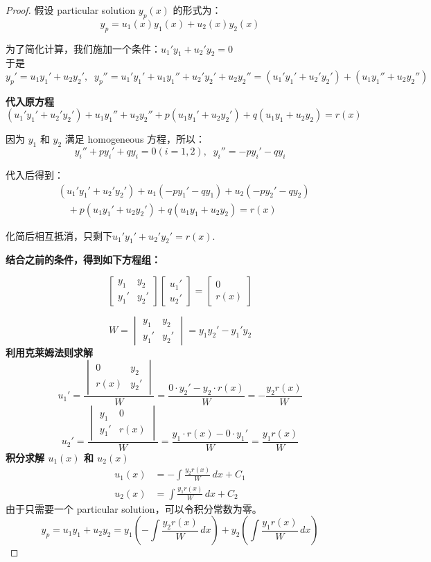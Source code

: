 \begin{proof}
假设 particular solution \( y_p(x) \) 的形式为：
\[y_p = u_1(x) y_1(x) + u_2(x) y_2(x)\]

为了简化计算，我们施加一个条件：$u_1' y_1 + u_2' y_2 = 0$
\\于是 \[y_p' = u_1 y_1' + u_2 y_2',
\;\;y_p'' = u_1' y_1' + u_1 y_1'' + u_2' y_2' + u_2 y_2'' = (u_1' y_1' + u_2' y_2') + (u_1 y_1'' + u_2 y_2'')\]

\textbf{代入原方程}
\[(u_1' y_1' + u_2' y_2') + u_1 y_1'' + u_2 y_2'' + p(u_1 y_1' + u_2 y_2') + q(u_1 y_1 + u_2 y_2) = r(x)\]

因为 \( y_1 \) 和 \( y_2 \) 满足 homogeneous 方程，所以：
\[y_i'' + p y_i' + q y_i = 0 (i = 1, 2), \;\;y_i'' = -p y_i' - q y_i\]

代入后得到：
\[\begin{aligned}
& (u_1' y_1' + u_2' y_2') + u_1 (-p y_1' - q y_1) + u_2 (-p y_2' - q y_2) \\
& \quad + p(u_1 y_1' + u_2 y_2') + q(u_1 y_1 + u_2 y_2) = r(x)
\end{aligned}\]

化简后相互抵消，只剩下$u_1' y_1' + u_2' y_2' = r(x)$.

\textbf{结合之前的条件，得到如下方程组：}

\[\begin{bmatrix}y_1 & y_2 \\y_1' & y_2'\end{bmatrix}
\begin{bmatrix}u_1' \\u_2'\end{bmatrix}=
\begin{bmatrix}0 \\r(x)\end{bmatrix}\]

\[W = \begin{vmatrix}y_1 & y_2 \\y_1' & y_2'\end{vmatrix} = y_1 y_2' - y_1' y_2\]
\textbf{利用克莱姆法则求解}
\[u_1' = \frac{\begin{vmatrix}0 & y_2 \\r(x) & y_2'\end{vmatrix}}{W} = \frac{0 \cdot y_2' - y_2 \cdot r(x)}{W} = -\frac{y_2 r(x)}{W}\]
\[u_2' = \frac{\begin{vmatrix}y_1 & 0 \\y_1' & r(x)
\end{vmatrix}}{W} = \frac{y_1 \cdot r(x) - 0 \cdot y_1'}{W} = \frac{y_1 r(x)}{W}\]
\textbf{积分求解 \( u_1(x) \) 和 \( u_2(x) \)}
\[\begin{aligned}
u_1(x) &= -\int \frac{y_2 r(x)}{W} \, dx + C_1 \\
u_2(x) &= \int \frac{y_1 r(x)}{W} \, dx + C_2
\end{aligned}\]
由于只需要一个 particular solution，可以令积分常数为零。
\[y_p = u_1 y_1 + u_2 y_2 = y_1 \left( -\int \frac{y_2 r(x)}{W} \, dx \right) + y_2 \left( \int \frac{y_1 r(x)}{W} \, dx \right)\]
\end{proof}

